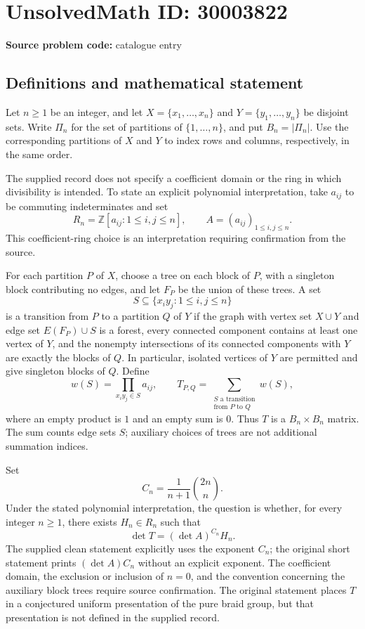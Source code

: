 \documentclass[11pt]{article}
\begin{document}
\section*{UnsolvedMath ID: 30003822}
\textbf{Source problem code:} catalogue entry
\subsection{Definitions and mathematical statement}
Let \(n\geq 1\) be an integer, and let \(X=\{x_1,\ldots,x_n\}\) and \(Y=\{y_1,\ldots,y_n\}\) be disjoint sets. Write \(\Pi_n\) for the set of partitions of \(\{1,\ldots,n\}\), and put \(B_n=|\Pi_n|\). Use the corresponding partitions of \(X\) and \(Y\) to index rows and columns, respectively, in the same order.

The supplied record does not specify a coefficient domain or the ring in which divisibility is intended. To state an explicit polynomial interpretation, take \(a_{ij}\) to be commuting indeterminates and set
\[
R_n=\mathbb Z[a_{ij}:1\leq i,j\leq n],\qquad A=(a_{ij})_{1\leq i,j\leq n}.
\]
This coefficient-ring choice is an interpretation requiring confirmation from the source.

For each partition \(P\) of \(X\), choose a tree on each block of \(P\), with a singleton block contributing no edges, and let \(F_P\) be the union of these trees. A set
\[
S\subseteq\{x_i y_j:1\leq i,j\leq n\}
\]
is a transition from \(P\) to a partition \(Q\) of \(Y\) if the graph with vertex set \(X\cup Y\) and edge set \(E(F_P)\cup S\) is a forest, every connected component contains at least one vertex of \(Y\), and the nonempty intersections of its connected components with \(Y\) are exactly the blocks of \(Q\). In particular, isolated vertices of \(Y\) are permitted and give singleton blocks of \(Q\). Define
\[
w(S)=\prod_{x_i y_j\in S}a_{ij},\qquad
T_{P,Q}=\sum_{\substack{S\text{ a transition}\\\text{from }P\text{ to }Q}}w(S),
\]
where an empty product is \(1\) and an empty sum is \(0\). Thus \(T\) is a \(B_n\times B_n\) matrix. The sum counts edge sets \(S\); auxiliary choices of trees are not additional summation indices.

Set
\[
C_n=\frac{1}{n+1}\binom{2n}{n}.
\]
Under the stated polynomial interpretation, the question is whether, for every integer \(n\geq1\), there exists \(H_n\in R_n\) such that
\[
\det T=(\det A)^{C_n}H_n.
\]
The supplied clean statement explicitly uses the exponent \(C_n\); the original short statement prints \((\det A)C_n\) without an explicit exponent. The coefficient domain, the exclusion or inclusion of \(n=0\), and the convention concerning the auxiliary block trees require source confirmation. The original statement places \(T\) in a conjectured uniform presentation of the pure braid group, but that presentation is not defined in the supplied record.
\end{document}
